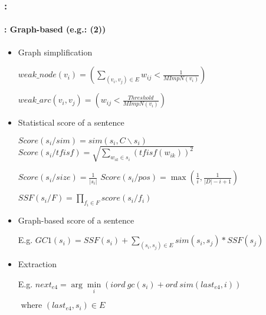 \documentclass[xcolor=table]{beamer}
\begin{document}
\begin{frame}
	\frametitle{\insertshortsubtitle: \insertsection}
	\framesubtitle{\insertsubsection: Graph-based (e.g.: \cite{21-aries-al} (2))}
	
	\vspace{-6pt}
	\begin{itemize}
		\item Graph simplification
		
		\hspace{.5cm}$weak\_node(v_i) = ( \sum_{(v_i, v_j) \in E} w_{ij} < \frac{1}{MImpN(v_i)} )$ 
		
		\hspace{.5cm}$weak\_arc(v_i, v_j) = ( w_{ij} < \frac{Threshold}{MImpN(v_i)})$
		
		\item Statistical score of a sentence
		
		\hspace{.5cm}$ Score(s_i/ sim) = sim(s_i, C\backslash s_i) $
		$Score(s_i/ tfisf) = \sqrt{\sum\limits_{w_{ik} \in s_i} (tfisf(w_{ik}))^2}$
		
		\hspace{.5cm}$Score(s_i/ size) = \frac{1}{|s_i|}$
		$Score(s_i/ pos) = \max (\frac{1}{i}, \frac{1}{|D| - i + 1})$
		
		\hspace{.5cm}$SSF(s_i/ F) = \prod_{f_i \in F} score(s_i/f_i)$
		
		\item Graph-based score of a sentence
		
		\hspace{.5cm}E.g. $GC1(s_i) = SSF(s_i) + \sum\limits_{(s_i, s_j) \in E} sim(s_i, s_j) * SSF(s_j)$
		
		\item Extraction
		
		\hspace{.5cm}E.g. $ next_{e4}  =  \arg\min\limits_i (iord\ gc(s_i) + ord\ sim(last_{e4}, i))$ 
		
		\hspace{3cm}$ \text{ where } (last_{e4}, s_i) \in E $
	\end{itemize}
	
\end{frame}
\end{document}
